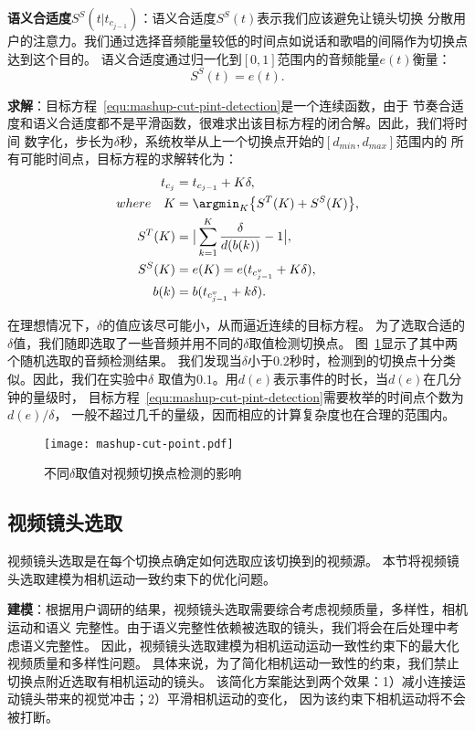 \textbf{语义合适度$S^S(t|t_{c_{j-1}})$}：语义合适度$S^S(t)$表示我们应该避免让镜头切换
分散用户的注意力。我们通过选择音频能量较低的时间点如说话和歌唱的间隔作为切换点达到这个目的。
语义合适度通过归一化到$[0,1]$范围内的音频能量$e(t)$衡量：
\begin{equation}
	S^S(t) = e(t).
\end{equation}

\textbf{求解}：目标方程~\ref{equ:mashup-cut-pint-detection}是一个连续函数，由于
节奏合适度和语义合适度都不是平滑函数，很难求出该目标方程的闭合解。因此，我们将时间
数字化，步长为$\delta$秒，系统枚举从上一个切换点开始的$[d_{min},d_{max}]$范围内的
所有可能时间点，目标方程的求解转化为：
\begin{equation}
	\begin{aligned}
		t_{c_j}   &= t_{c_{j-1}} + K\delta, \\
		where \quad K &= \argmin_{K}\big\{S^T(K) + S^S(K)\big\},\\
		S^T(K)  &= \big|\sum_{k=1}^K{\frac{\delta}{d(b(k))}} - 1\big|, \\
		S^S(K)  &= e(K)= e(t_{c_{j-1}^v}  + K\delta), \\
		b(k)    &= b(t_{c_{j-1}^v}  + k\delta).\\
	\end{aligned}
\end{equation}

在理想情况下，$\delta$的值应该尽可能小，从而逼近连续的目标方程。
为了选取合适的$\delta$值，我们随即选取了一些音频并用不同的$\delta$取值检测切换点。
图~\ref{fig:mashup-cut-point}显示了其中两个随机选取的音频检测结果。
我们发现当$\delta$小于$0.2$秒时，检测到的切换点十分类似。因此，我们在实验中$\delta$
取值为$0.1$。用$d(e)$表示事件的时长，当$d(e)$在几分钟的量级时，
目标方程~\ref{equ:mashup-cut-pint-detection}需要枚举的时间点个数为$d(e)/\delta$，
一般不超过几千的量级，因而相应的计算复杂度也在合理的范围内。
\begin{figure}[ht]
    \centering
    \texttt{[image: mashup-cut-point.pdf]}
    \caption{不同$\delta$取值对视频切换点检测的影响}
    \label{fig:mashup-cut-point}
\end{figure}

\subsection{视频镜头选取}
视频镜头选取是在每个切换点确定如何选取应该切换到的视频源。
本节将视频镜头选取建模为相机运动一致约束下的优化问题。

\textbf{建模}：根据用户调研的结果，视频镜头选取需要综合考虑视频质量，多样性，相机运动和语义
完整性。由于语义完整性依赖被选取的镜头，我们将会在后处理中考虑语义完整性。
因此，视频镜头选取建模为相机运动运动一致性约束下的最大化视频质量和多样性问题。
具体来说，为了简化相机运动一致性的约束，我们禁止切换点附近选取有相机运动的镜头。
该简化方案能达到两个效果：1）减小连接运动镜头带来的视觉冲击；2）平滑相机运动的变化，
因为该约束下相机运动将不会被打断。

